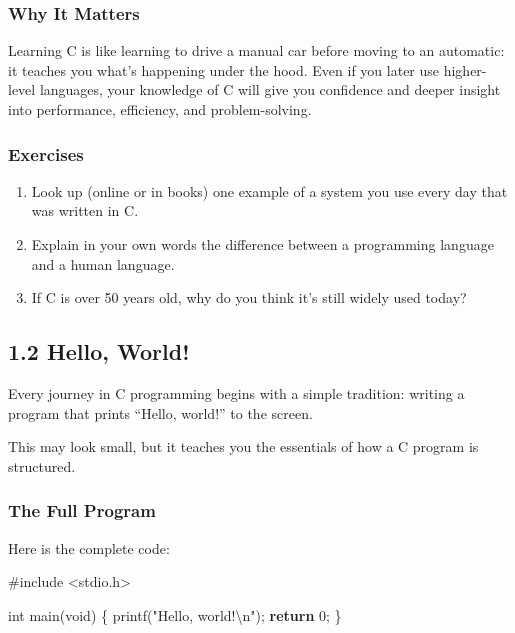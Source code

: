 \documentclass[
  letterpaper,
  DIV=11,
  numbers=noendperiod]{scrreprt}
\newenvironment{Shaded}{\begin{snugshade}}{\end{snugshade}}
\newcommand{\ControlFlowTok}[1]{\textcolor[rgb]{0.00,0.23,0.31}{\textbf{#1}}}
\newcommand{\DataTypeTok}[1]{\textcolor[rgb]{0.68,0.00,0.00}{#1}}
\newcommand{\DecValTok}[1]{\textcolor[rgb]{0.68,0.00,0.00}{#1}}
\newcommand{\ImportTok}[1]{\textcolor[rgb]{0.00,0.46,0.62}{#1}}
\newcommand{\NormalTok}[1]{\textcolor[rgb]{0.00,0.23,0.31}{#1}}
\newcommand{\OperatorTok}[1]{\textcolor[rgb]{0.37,0.37,0.37}{#1}}
\newcommand{\PreprocessorTok}[1]{\textcolor[rgb]{0.68,0.00,0.00}{#1}}
\newcommand{\SpecialCharTok}[1]{\textcolor[rgb]{0.37,0.37,0.37}{#1}}
\newcommand{\StringTok}[1]{\textcolor[rgb]{0.13,0.47,0.30}{#1}}
\providecommand{\tightlist}{%
  \setlength{\itemsep}{0pt}\setlength{\parskip}{0pt}}
\begin{document}
\subsubsection{Why It Matters}\label{why-it-matters}

Learning C is like learning to drive a manual car before moving to an
automatic: it teaches you what's happening under the hood. Even if you
later use higher-level languages, your knowledge of C will give you
confidence and deeper insight into performance, efficiency, and
problem-solving.

\subsubsection{Exercises}\label{exercises}

\begin{enumerate}
\def\labelenumi{\arabic{enumi}.}
\tightlist
\item
  Look up (online or in books) one example of a system you use every day
  that was written in C.
\item
  Explain in your own words the difference between a programming
  language and a human language.
\item
  If C is over 50 years old, why do you think it's still widely used
  today?
\end{enumerate}

\subsection{1.2 Hello, World!}\label{hello-world}

Every journey in C programming begins with a simple tradition: writing a
program that prints ``Hello, world!'' to the screen.

This may look small, but it teaches you the essentials of how a C
program is structured.

\subsubsection{The Full Program}\label{the-full-program}

Here is the complete code:

\begin{Shaded}
\begin{Highlighting}[]
\PreprocessorTok{\#include }\ImportTok{\textless{}stdio.h\textgreater{}}

\DataTypeTok{int}\NormalTok{ main}\OperatorTok{(}\DataTypeTok{void}\OperatorTok{)} \OperatorTok{\{}
\NormalTok{    printf}\OperatorTok{(}\StringTok{"Hello, world!}\SpecialCharTok{\textbackslash{}n}\StringTok{"}\OperatorTok{);}
    \ControlFlowTok{return} \DecValTok{0}\OperatorTok{;}
\OperatorTok{\}}
\end{Highlighting}
\end{Shaded}
\end{document}
